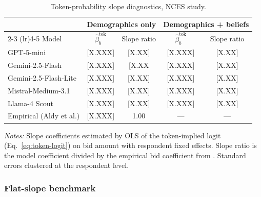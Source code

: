 \documentclass[12pt]{article}
\begin{document}
\begin{table}[h]
    \centering
    \caption{Token-probability slope diagnostics, NCES study.}
    \label{tab:token-slopes}
    \begin{threeparttable}
    \begin{tabular}{lcccc}
        \toprule
         & \multicolumn{2}{c}{Demographics only} & \multicolumn{2}{c}{Demographics + beliefs} \\
        \cmidrule(lr){2-3} \cmidrule(lr){4-5}
        Model & $\hat{\beta}_b^{\text{tok}}$ & Slope ratio & $\hat{\beta}_b^{\text{tok}}$ & Slope ratio \\
        \midrule
        GPT-5-mini             & [X.XXX] & [X.XX] & [X.XXX] & [X.XX] \\
        Gemini-2.5-Flash       & [X.XXX] & [X.XX & [X.XXX] & [X.XX] \\
        Gemini-2.5-Flash-Lite  & [X.XXX] & [X.XX] & [X.XXX] & [X.XX] \\
        Mistral-Medium-3.1     & [X.XXX] & [X.XX] & [X.XXX] & [X.XX] \\
        Llama-4 Scout          & [X.XXX] & [X.XX] & [X.XXX] & [X.XX] \\
        \midrule
        Empirical (Aldy et al.) & [X.XXX] & 1.00 & --- & --- \\
        \bottomrule
    \end{tabular}
    \begin{tablenotes}\footnotesize
    \item \textit{Notes:} Slope coefficients estimated by OLS of the token-implied logit (Eq.~\ref{eq:token-logit}) on bid amount with respondent fixed effects. Slope ratio is the model coefficient divided by the empirical bid coefficient from \textcite{Aldy2012}. Standard errors clustered at the respondent level.
    \end{tablenotes}
    \end{threeparttable}
\end{table}

\subsubsection{Flat-slope benchmark}
\end{document}
